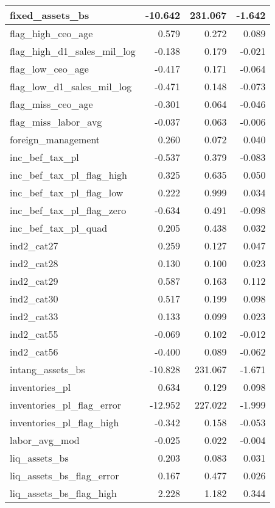 \begin{table}
\begin{tabular}[t]{l|r|r|r}
\hline
fixed\_assets\_bs & -10.642 & 231.067 & -1.642\\
\hline
flag\_high\_ceo\_age & 0.579 & 0.272 & 0.089\\
\hline
flag\_high\_d1\_sales\_mil\_log & -0.138 & 0.179 & -0.021\\
\hline
flag\_low\_ceo\_age & -0.417 & 0.171 & -0.064\\
\hline
flag\_low\_d1\_sales\_mil\_log & -0.471 & 0.148 & -0.073\\
\hline
flag\_miss\_ceo\_age & -0.301 & 0.064 & -0.046\\
\hline
flag\_miss\_labor\_avg & -0.037 & 0.063 & -0.006\\
\hline
foreign\_management & 0.260 & 0.072 & 0.040\\
\hline
inc\_bef\_tax\_pl & -0.537 & 0.379 & -0.083\\
\hline
inc\_bef\_tax\_pl\_flag\_high & 0.325 & 0.635 & 0.050\\
\hline
inc\_bef\_tax\_pl\_flag\_low & 0.222 & 0.999 & 0.034\\
\hline
inc\_bef\_tax\_pl\_flag\_zero & -0.634 & 0.491 & -0.098\\
\hline
inc\_bef\_tax\_pl\_quad & 0.205 & 0.438 & 0.032\\
\hline
ind2\_cat27 & 0.259 & 0.127 & 0.047\\
\hline
ind2\_cat28 & 0.130 & 0.100 & 0.023\\
\hline
ind2\_cat29 & 0.587 & 0.163 & 0.112\\
\hline
ind2\_cat30 & 0.517 & 0.199 & 0.098\\
\hline
ind2\_cat33 & 0.133 & 0.099 & 0.023\\
\hline
ind2\_cat55 & -0.069 & 0.102 & -0.012\\
\hline
ind2\_cat56 & -0.400 & 0.089 & -0.062\\
\hline
intang\_assets\_bs & -10.828 & 231.067 & -1.671\\
\hline
inventories\_pl & 0.634 & 0.129 & 0.098\\
\hline
inventories\_pl\_flag\_error & -12.952 & 227.022 & -1.999\\
\hline
inventories\_pl\_flag\_high & -0.342 & 0.158 & -0.053\\
\hline
labor\_avg\_mod & -0.025 & 0.022 & -0.004\\
\hline
liq\_assets\_bs & 0.203 & 0.083 & 0.031\\
\hline
liq\_assets\_bs\_flag\_error & 0.167 & 0.477 & 0.026\\
\hline
liq\_assets\_bs\_flag\_high & 2.228 & 1.182 & 0.344\\

\end{tabular}
\end{table}
